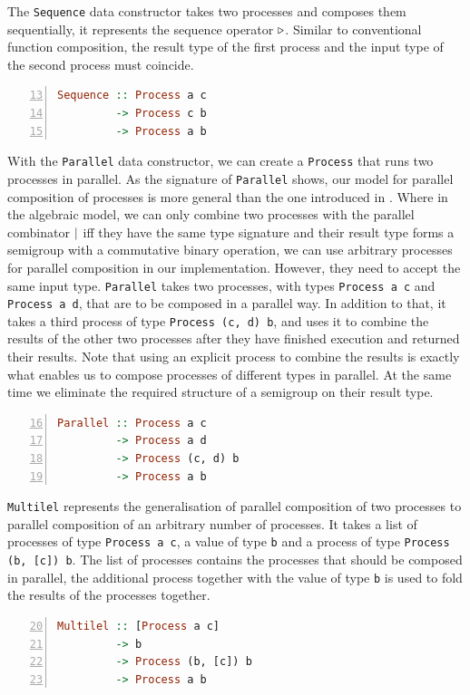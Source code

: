 The \texttt{Sequence} data constructor takes two processes and composes them sequentially, it represents the sequence operator $\triangleright$. Similar to conventional function composition, the result type of the first process and the input type of the second process must coincide.
\begin{lstlisting}[language=Haskell,caption=Signature of the \texttt{Seqeuence} data constructor.,numbers=left,frame=bt,firstnumber=13]
Sequence :: Process a c
         -> Process c b
         -> Process a b
\end{lstlisting}

With the \texttt{Parallel} data constructor, we can create a \texttt{Process} that runs two processes in parallel. As the signature of \texttt{Parallel} shows, our model for parallel composition of processes is more general than the one introduced in . Where in the algebraic model, we can only combine two processes with the parallel combinator $|$ iff they have the same type signature and their result type forms a semigroup with a commutative binary operation, we can use arbitrary processes for parallel composition in our implementation. However, they need to accept the same input type. \texttt{Parallel} takes two processes, with types \texttt{Process a c} and \texttt{Process a d}, that are to be composed in a parallel way. In addition to that, it takes a third process of type \texttt{Process (c, d) b}, and uses it to combine the results of the other two processes after they have finished execution and returned their results. Note that using an explicit process to combine the results is exactly what enables us to compose processes of different types in parallel. At the same time we eliminate the required structure of a semigroup on their result type.
\begin{lstlisting}[language=Haskell,caption=Signature of the \texttt{Parallel} data constructor.,numbers=left,frame=bt,firstnumber=16]
Parallel :: Process a c
         -> Process a d
         -> Process (c, d) b
         -> Process a b
\end{lstlisting}

\texttt{Multilel} represents the generalisation of parallel composition of two processes to parallel composition of an arbitrary number of processes. It takes a list of processes of type \texttt{Process a c}, a value of type \texttt{b} and a process of type \texttt{Process (b, [c]) b}. The list of processes contains the processes that should be composed in parallel, the additional process together with the value of type \texttt{b} is used to fold the results of the processes together.
\begin{lstlisting}[language=Haskell,caption=Signature of the \texttt{Multilel} data constructor.,numbers=left,frame=bt,firstnumber=20]
Multilel :: [Process a c]
         -> b
         -> Process (b, [c]) b
         -> Process a b
\end{lstlisting}

